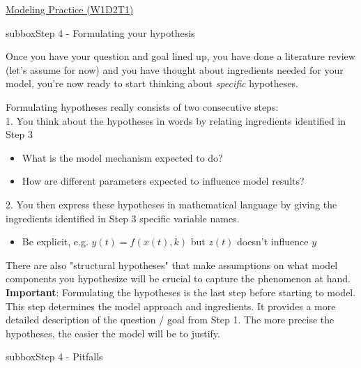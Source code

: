 \begin{textbox}{\href{https://compneuro.neuromatch.io/tutorials/W1D2_ModelingPractice/W1D2_Intro.html}{Modeling Practice  (W1D2T1)} }

\begin{subbox}{subbox}{Step 4 - Formulating your hypothesis  }
\scriptsize

Once you have your question and goal lined up, you have done a literature review (let's assume for now) and you have thought about ingredients needed for your model, you're now ready to start thinking about \textit{specific} hypotheses.

Formulating hypotheses really consists of two consecutive steps:\\



1.   You think about the hypotheses in words by relating ingredients identified in Step 3
\begin{itemize}
    \item 
       What is the model mechanism expected to do? 
          \item  How are different parameters expected to influence model results?
      \end{itemize}

2.   You then express these hypotheses in mathematical language by giving the ingredients identified in Step 3 specific variable names. 
\begin{itemize}
         \item  Be explicit, e.g. $y(t)=f(x(t),k)$ but $z(t)$ doesn’t influence $y$
          \end{itemize}



There are also "structural hypotheses" that make assumptions on what model components you hypothesize will be crucial to capture the phenomenon at hand.\\ 

\textbf{Important}: Formulating the hypotheses is the last step before starting to model. This step determines the model approach and ingredients. It provides a more detailed description of the question / goal from Step 1. The more precise the hypotheses, the easier the model will be to justify. 
  \end{subbox}
\begin{subbox}{subbox}{Step 4 - Pitfalls }
\scriptsize


\end{subbox}
\end{textbox}
